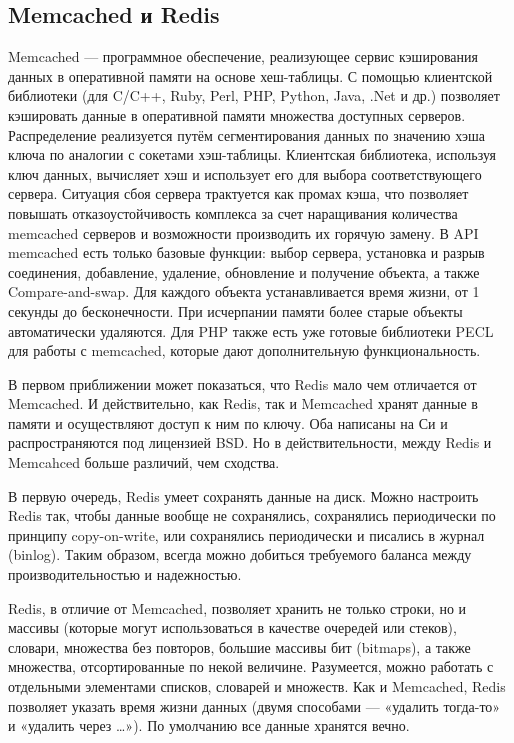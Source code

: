\subsection{Memcached и Redis}
\label{sec:analysis:mem}

Memcached — программное обеспечение, реализующее сервис кэширования данных в оперативной памяти на основе хеш-таблицы.
С помощью клиентской библиотеки (для C/C++, Ruby, Perl, PHP, Python, Java, .Net и др.) позволяет кэшировать данные в оперативной памяти множества доступных серверов. Распределение реализуется путём сегментирования данных по значению хэша ключа по аналогии с сокетами хэш-таблицы. Клиентская библиотека, используя ключ данных, вычисляет хэш и использует его для выбора соответствующего сервера. Ситуация сбоя сервера трактуется как промах кэша, что позволяет повышать отказоустойчивость комплекса за счет наращивания количества memcached серверов и возможности производить их горячую замену.
В API memcached есть только базовые функции: выбор сервера, установка и разрыв соединения, добавление, удаление, обновление и получение объекта, а также Compare-and-swap. Для каждого объекта устанавливается время жизни, от 1 секунды до бесконечности. При исчерпании памяти более старые объекты автоматически удаляются. Для PHP также есть уже готовые библиотеки PECL для работы с memcached, которые дают дополнительную функциональность.

В первом приближении может показаться, что Redis мало чем отличается от Memcached. И действительно, как Redis, так и Memcached хранят данные в памяти и осуществляют доступ к ним по ключу. Оба написаны на Си и распространяются под лицензией BSD. Но в действительности, между Redis и Memcahced больше различий, чем сходства.

В первую очередь, Redis умеет сохранять данные на диск. Можно настроить Redis так, чтобы данные вообще не сохранялись, сохранялись периодически по принципу copy-on-write, или сохранялись периодически и писались в журнал (binlog). Таким образом, всегда можно добиться требуемого баланса между производительностью и надежностью.

Redis, в отличие от Memcached, позволяет хранить не только строки, но и массивы (которые могут использоваться в качестве очередей или стеков), словари, множества без повторов, большие массивы бит (bitmaps), а также множества, отсортированные по некой величине. Разумеется, можно работать с отдельными элементами списков, словарей и множеств. Как и Memcached, Redis позволяет указать время жизни данных (двумя способами — «удалить тогда-то» и «удалить через …»). По умолчанию все данные хранятся вечно.

